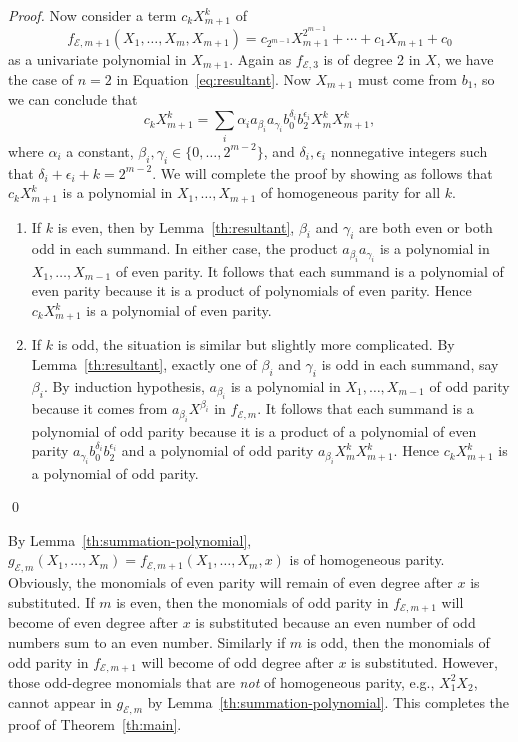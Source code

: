 \begin{proof}
  Now consider a term $c_kX_{m+1}^k$ of
  \[ f_{\mathcal
      E,m+1}(X_1,\ldots,X_m,X_{m+1})=c_{2^{m-1}}X_{m+1}^{2^{m-1}}+\cdots+c_1X_{m+1}+c_0 \]
  as a univariate polynomial in $X_{m+1}$.
  Again as $f_{\mathcal E,3}$ is of degree 2 in $X$, we have the case
  of $n=2$ in Equation~\ref{eq:resultant}.
  Now $X_{m+1}$ must come from $b_1$, so we can conclude that
  \[ c_kX_{m+1}^k=\sum_i\alpha_i a_{\beta_i} a_{\gamma_i}
    b_0^{\delta_i} b_2^{\epsilon_i} X_m^kX_{m+1}^k, \] where
  $\alpha_i$ a constant, $\beta_i,\gamma_i\in\{0,\ldots,2^{m-2}\}$,
  and $\delta_i,\epsilon_i$ nonnegative integers such that
  $\delta_i+\epsilon_i+k=2^{m-2}$.
  We will complete the proof by showing as follows that $c_kX_{m+1}^k$
  is a polynomial in $X_1,\ldots,X_{m+1}$ of homogeneous parity for
  all $k$.
  \begin{enumerate}
  \item If $k$ is even, then by Lemma~\ref{th:resultant},  $\beta_i$
    and $\gamma_i$ are both even or both odd in each summand.
    In either case, the product $a_{\beta_i}a_{\gamma_i}$ is a
    polynomial in $X_1,\ldots,X_{m-1}$ of even parity.
    It follows that each summand is a polynomial of even parity
    because it is a product of polynomials of even parity.
    Hence $c_kX_{m+1}^k$ is a polynomial of even parity.
  \item If $k$ is odd, the situation is similar but slightly more
    complicated.
    By Lemma~\ref{th:resultant}, exactly one of $\beta_i$ and
    $\gamma_i$ is odd in each summand, say $\beta_i$.
    By induction hypothesis, $a_{\beta_i}$ is a polynomial in
    $X_1,\ldots,X_{m-1}$ of odd parity because it comes from
    $a_{\beta_i} X^{\beta_i}$ in $f_{\mathcal E,m}$.
    It follows that each summand is a polynomial of odd parity because
    it is a product of a polynomial of even parity
    $a_{\gamma_i} b_0^{\delta_i} b_2^{\epsilon_i}$ and a polynomial of
    odd parity $a_{\beta_i} X_m^kX_{m+1}^k$.
    Hence $c_kX_{m+1}^k$ is a polynomial of odd parity.
  \end{enumerate}
  \qed
\end{proof}

By Lemma~\ref{th:summation-polynomial},
$g_{\mathcal E,m}(X_1,\ldots,X_m)=f_{\mathcal
  E,m+1}(X_1,\ldots,X_m,x)$ is of homogeneous parity.
%
Obviously, the monomials of even parity will remain of even degree
after $x$ is substituted.
%
If $m$ is even, then the monomials of odd parity in
$f_{\mathcal E,m+1}$ will become of even degree after $x$ is
substituted because an even number of odd numbers sum to an even
number.
%
Similarly if $m$ is odd, then the monomials of odd parity in
$f_{\mathcal E,m+1}$ will become of odd degree after $x$ is
substituted.
%
However, those odd-degree monomials that are \emph{not} of homogeneous
parity, e.g., $X_1^2X_2$, cannot appear in $g_{\mathcal E,m}$ by
Lemma~\ref{th:summation-polynomial}.
%
This completes the proof of Theorem~\ref{th:main}.
